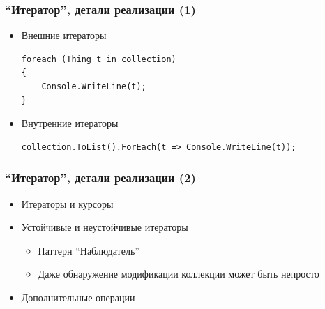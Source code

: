 \documentclass[xetex,mathserif,serif]{beamer}
\begin{document}
	\begin{frame}[fragile]
		\frametitle{``Итератор'', детали реализации (1)}
		\begin{itemize}
			\item Внешние итераторы
			\begin{verbatim}
foreach (Thing t in collection)
{
    Console.WriteLine(t);
} 
			\end{verbatim}
			\item Внутренние итераторы
			\begin{verbatim}
collection.ToList().ForEach(t => Console.WriteLine(t));
			\end{verbatim}
		\end{itemize}
	\end{frame}

	\begin{frame}
		\frametitle{``Итератор'', детали реализации (2)}
		\begin{itemize}
			\item Итераторы и курсоры
			\item Устойчивые и неустойчивые итераторы
			\begin{itemize}
				\item Паттерн ``Наблюдатель''
				\item Даже обнаружение модификации коллекции может быть непросто
			\end{itemize}
			\item Дополнительные операции
		\end{itemize}
	\end{frame}
\end{document}
